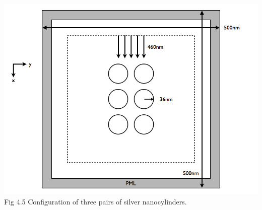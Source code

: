 \documentclass[openany]{book}
\begin{document}
\begin{center}
\includegraphics[scale=0.5]{images/open-cavity-config.jpg}\\
Fig 4.5
Configuration of three pairs of silver nanocylinders.
\end{center}
\end{document}
